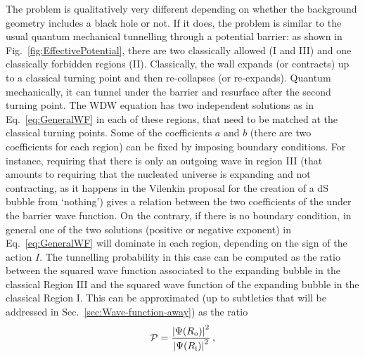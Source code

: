 \documentclass[11pt,a4paper]{article}
\begin{document}
The problem is qualitatively very different depending on whether the background geometry includes a black hole or not. If it does, the problem is similar to the usual quantum mechanical tunnelling through a potential barrier: as shown in Fig.~\eqref{fig:EffectivePotential}, there are two classically allowed (I and III) and one classically forbidden regions (II). Classically, the wall expands (or contracts) up to a classical turning point and then re-collapses (or re-expands). Quantum mechanically, it can tunnel under the barrier and resurface after the second turning point. The WDW equation has two independent solutions as in Eq.~\eqref{eq:GeneralWF} in each of these regions, that need to be matched at the classical turning points. Some of the coefficients $a$ and $b$ (there are two coefficients for each region) can be fixed by imposing boundary conditions. For instance, requiring that there is only an outgoing wave in region III (that amounts to requiring that the nucleated universe is expanding and not contracting, as it happens in the Vilenkin proposal for the creation of a dS bubble from `nothing') gives a relation between the two coefficients of the under the barrier wave function. On the contrary, if there is no boundary condition, in general one of the two solutions (positive or negative exponent) in Eq.~\eqref{eq:GeneralWF} will dominate in each region, depending on the sign of the action $I$. 
The tunnelling  probability in this case can be computed as the ratio between the squared wave function associated to the expanding bubble in the classical Region III and the squared wave function of the expanding bubble in the classical Region I. This can be approximated (up to subtleties that will be addressed in Sec.~\ref{sec:Wave-function-away}) as the ratio
\begin{equation}
\label{eq:TunnellingProbabilitySdS}
\mathcal{P} = \frac{\left|\Psi(R_{\rm o})\right|^2}{\left|\Psi(R_{\rm i})\right|^2} \,,
\end{equation}
\end{document}
